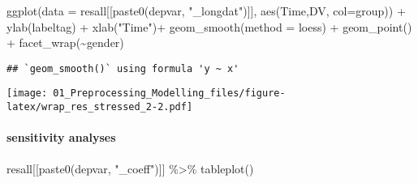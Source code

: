 \documentclass[
]{article}
\newenvironment{Shaded}{\begin{snugshade}}{\end{snugshade}}
\newcommand{\AttributeTok}[1]{\textcolor[rgb]{0.77,0.63,0.00}{#1}}
\newcommand{\FunctionTok}[1]{\textcolor[rgb]{0.00,0.00,0.00}{#1}}
\newcommand{\NormalTok}[1]{#1}
\newcommand{\SpecialCharTok}[1]{\textcolor[rgb]{0.00,0.00,0.00}{#1}}
\newcommand{\StringTok}[1]{\textcolor[rgb]{0.31,0.60,0.02}{#1}}
\begin{document}
\begin{Shaded}
\begin{Highlighting}[]
\FunctionTok{ggplot}\NormalTok{(}\AttributeTok{data =}\NormalTok{ resall[[}\FunctionTok{paste0}\NormalTok{(depvar, }\StringTok{"\_longdat"}\NormalTok{)]], }
       \FunctionTok{aes}\NormalTok{(Time,DV, }\AttributeTok{col=}\NormalTok{group)) }\SpecialCharTok{+} 
  \FunctionTok{ylab}\NormalTok{(labeltag) }\SpecialCharTok{+} \FunctionTok{xlab}\NormalTok{(}\StringTok{"Time"}\NormalTok{)}\SpecialCharTok{+}
  \FunctionTok{geom\_smooth}\NormalTok{(}\AttributeTok{method =} \StringTok{\textquotesingle{}loess\textquotesingle{}}\NormalTok{) }\SpecialCharTok{+} \FunctionTok{geom\_point}\NormalTok{() }\SpecialCharTok{+}   \FunctionTok{facet\_wrap}\NormalTok{(}\SpecialCharTok{\textasciitilde{}}\NormalTok{gender)}
\end{Highlighting}
\end{Shaded}

\begin{verbatim}
## `geom_smooth()` using formula 'y ~ x'
\end{verbatim}

\texttt{[image: 01\_Preprocessing\_Modelling\_files/figure-latex/wrap\_res\_stressed\_2-2.pdf]}

\hypertarget{sensitivity-analyses}{%
\paragraph{sensitivity analyses}\label{sensitivity-analyses}}

\begin{Shaded}
\begin{Highlighting}[]
\NormalTok{resall[[}\FunctionTok{paste0}\NormalTok{(depvar, }\StringTok{"\_coeff"}\NormalTok{)]] }\SpecialCharTok{\%\textgreater{}\%} \FunctionTok{tableplot}\NormalTok{()}
\end{Highlighting}
\end{Shaded}
\end{document}
